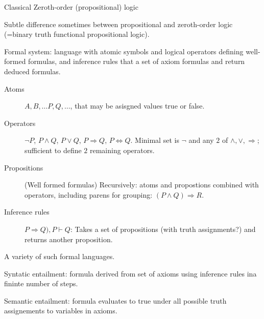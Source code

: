 \setcounter{currentlevel}{\value{baseSectionLevel}}
\label{sec:Logic}

\cite{wiki:Logic}


\label{sec:Zeroth_order_logic}

Classical Zeroth-order (propositional) 
logic~\cite{iep:Propositional_logic,
wiki:Propositional_calculus,
wiki:Zeroth_order_logic}

Subtle difference sometimes between propositional
and zeroth-order logic 
(=binary truth functional propositional logic).

Formal system:
language with atomic symbols
and logical operators defining well-formed formulas,
and inference rules that a set of axiom formulas 
and return deduced formulas.
\begin{description}
\item[Atoms]  $A, B, \ldots P, Q, \ldots$, 
that may be asisgned values \textsf{true} or \textsf{false}.

\item[Operators] $\lnot P$, $P \wedge Q$, $P \vee Q$, 
$P \Rightarrow Q$, $P \Leftrightarrow Q$. 
Minimal set is $\lnot$ and 
any $2$ of  $\wedge, \vee, \Rightarrow$;
sufficient to define $2$ remaining operators.

\item[Propositions] (Well formed formulas)
Recursively: atoms and propostions combined with operators,
including parens for grouping: $(P \wedge Q) \Rightarrow R$.

\item[Inference rules] ${P \Rightarrow Q), P} \vdash Q$:
Takes a set of propositions (with truth assignments?)
and returns another proposition.
\end{description}

A variety of such formal languages.

Syntatic entailment: formula derived from set of axioms 
using inference rules ina fininte number of steps.

Semantic entailment: formula evaluates to \textsf{true}
under all possible truth assignements to variables
in axioms.

